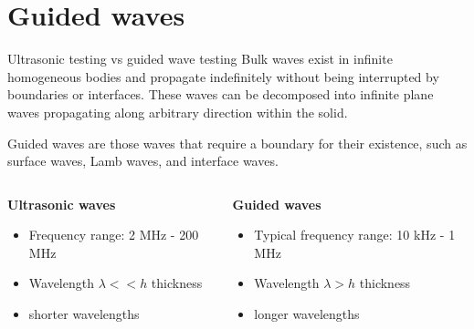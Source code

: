 \documentclass[10pt,aspectratio=169,dvipsnames]{beamer} %
\begin{document}
\section{Guided waves}
\begin{frame}{Ultrasonic testing vs guided wave testing}
	\alert{Bulk waves} exist in infinite homogeneous bodies and propagate indefinitely without being interrupted by boundaries or interfaces. 
	These waves can be decomposed into infinite plane waves propagating along arbitrary direction within the solid.
	
	\alert{Guided waves} are those waves that require a boundary for their existence, such as surface waves, Lamb waves, and interface waves.
	\vspace{5mm}
	\begin{columns}[T]
		\begin{column}{0.5\textwidth}
			\textbf{Ultrasonic waves}	
			\begin{itemize}
				\item Frequency range: 2 MHz - 200 MHz
				\item Wavelength \(\lambda << h\) thickness 
				\item shorter wavelengths
			\end{itemize}
		\end{column}
		\begin{column}{0.5\textwidth}
			\textbf{Guided waves}	
			\begin{itemize}
				\item Typical frequency range: 10 kHz - 1 MHz
				\item Wavelength \(\lambda > h\) thickness 
				\item longer wavelengths
			\end{itemize}
		\end{column}
	\end{columns}			
\end{frame}
\end{document}
